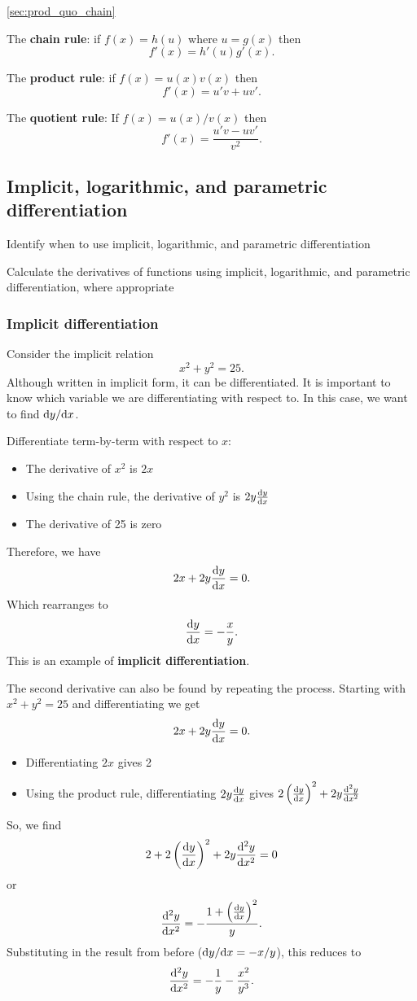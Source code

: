 \begin{recap}{\ref{sec:prod_quo_chain}}
\item The \textbf{chain rule}: if $f(x)=h(u)$ where $u=g(x)$ then
\[
f'(x)=h'(u)g'(x).
\]
\item The \textbf{product rule}: if $f(x)=u(x)v(x)$ then
\[
f'(x)=u'v+uv'.
\]
\item The \textbf{quotient rule}: If $f(x)=u(x)/v(x)$ then
\[
f'(x)=\frac{u'v-uv'}{v^2}.
\]
\end{recap}

\goodbreak
\subsection{Implicit, logarithmic, and parametric differentiation}
\label{sec:other_diff_rules}

\begin{learningoutcomes}
\item Identify when to use implicit, logarithmic, and parametric differentiation
\item Calculate the derivatives of functions using implicit, logarithmic, and parametric differentiation, where appropriate
\end{learningoutcomes}

\subsubsection{Implicit differentiation}

Consider the implicit relation
\[
x^2+y^2=25.
\]
Although written in implicit form, it can be differentiated. It is important to know which variable we are differentiating with respect to. In this case, we want to find ${\rm d}y/{\rm d}x$.

Differentiate term-by-term with respect to $x$:
\begin{itemize}
\item The derivative of $x^2$ is $2x$
\item Using the chain rule, the derivative of $y^2$ is $2y\frac{{\rm d} y}{{\rm d} x}$
\item The derivative of 25 is zero
\end{itemize}
Therefore, we have
\[
2x+2y\frac{{\rm d} y}{{\rm d} x}=0.
\]
Which rearranges to
\[
\frac{{\rm d} y}{{\rm d} x}=-\frac{x}{y}.
\]
This is an example of \textbf{implicit differentiation}.

The second derivative can also be found by repeating the process. Starting with $x^2+y^2=25$ and differentiating we get
\[
2x+2y\frac{{\rm d} y}{{\rm d} x}=0.
\]
\begin{itemize}
\item Differentiating $2x$ gives 2
\item Using the product rule, differentiating $2y\frac{{\rm d} y}{{\rm d} x}$ gives $2\left(\frac{{\rm d} y}{{\rm d} x}\right)^2+2y\frac{{\rm d} ^2y}{{\rm d} x^2}$
\end{itemize}
So, we find
\[
2+2\left(\frac{{\rm d} y}{{\rm d} x}\right)^2+2y\frac{{\rm d} ^2y}{{\rm d} x^2}=0
\]
or
\[
\frac{{\rm d} ^2y}{{\rm d} x^2}=-\frac{1+\left(\frac{{\rm d} y}{{\rm d} x}\right)^2}{y}.
\]
Substituting in the result from before (${\rm d}y/{\rm d}x=-x/y$), this reduces to
\[
\frac{{\rm d} ^2y}{{\rm d} x^2}=-\frac{1}{y}-\frac{x^2}{y^3}.
\]

